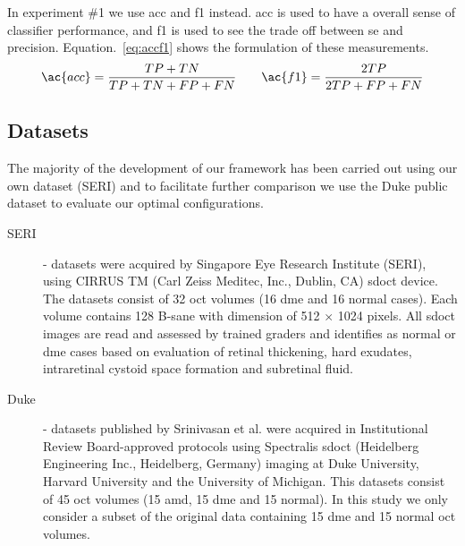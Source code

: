 In experiment \#1 we use \ac{acc} and \ac{f1} instead.
\acl{acc} is used to have a overall sense of classifier performance, and \ac{f1} is used to see the trade off between \ac{se} and precision.
Equation.~\ref{eq:accf1} shows the formulation of these measurements. 
\begin{align}
\ac{acc} = \frac{TP+TN}{TP+TN+FP+FN} \qquad \ac{f1} = \frac{2TP}{2TP +FP+FN}
\label{eq:accf1}
\end{align}


\subsection{Datasets}\label{sec:exp:datasets}

The majority of the development of our framework has been carried out using our own dataset (SERI) and to facilitate further comparison we use the Duke public dataset to evaluate our optimal configurations.

\begin{description}

\item[SERI]- datasets were acquired by Singapore Eye Research Institute (SERI), using CIRRUS TM (Carl Zeiss Meditec, Inc., Dublin, CA) \ac{sdoct} device. The datasets consist of 32 \ac{oct} volumes (16 \ac{dme} and 16 normal cases). Each volume contains 128 B-sane with  dimension of 512 $\times$ 1024 pixels.  All \ac{sdoct} images are read and assessed by trained graders and identifies as normal or \ac{dme} cases based on evaluation of retinal thickening, hard exudates, intraretinal cystoid space formation and subretinal fluid.

\item[Duke] - datasets published by Srinivasan et al. \cite{Srinivasan2014} were acquired in Institutional Review Board-approved protocols using Spectralis \ac{sdoct} (Heidelberg Engineering Inc., Heidelberg, Germany) imaging at Duke University, Harvard University and the University of Michigan. This datasets consist of 45 \ac{oct} volumes (15 \ac{amd}, 15 \ac{dme} and 15 normal). In this study we only consider a subset of the original data containing 15 \ac{dme} and 15 normal \ac{oct} volumes.

\end{description}



